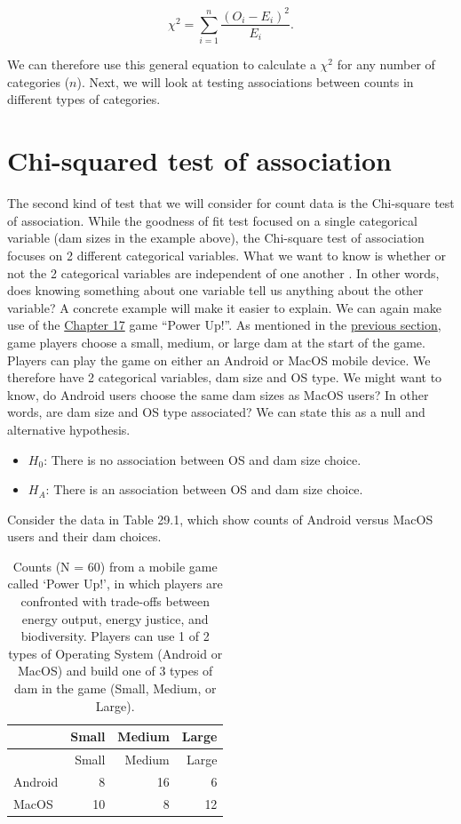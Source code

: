 \documentclass[
]{scrbook}
\providecommand{\tightlist}{%
  \setlength{\itemsep}{0pt}\setlength{\parskip}{0pt}}
\begin{document}
\[\chi^{2} = \sum_{i = 1}^{n} \frac{\left(O_{i} - E_{i}\right)^{2}}{E_{i}}.\]

We can therefore use this general equation to calculate a \(\chi^{2}\) for any number of categories (\(n\)).
Next, we will look at testing associations between counts in different types of categories.

\hypertarget{chi-squared-test-of-association}{%
\section{Chi-squared test of association}\label{chi-squared-test-of-association}}

The second kind of test that we will consider for count data is the Chi-square test of association.
While the goodness of fit test focused on a single categorical variable (dam sizes in the example above), the Chi-square test of association focuses on 2 different categorical variables.
What we want to know is whether or not the 2 categorical variables are independent of one another \citep{Box1978}.
In other words, does knowing something about one variable tell us anything about the other variable?
A concrete example will make it easier to explain.
We can again make use of the \protect\hyperlink{Chapter_17}{Chapter 17} game ``Power Up!''.
As mentioned in the \protect\hyperlink{chi-squared-goodness-of-fit}{previous section}, game players choose a small, medium, or large dam at the start of the game.
Players can play the game on either an Android or MacOS mobile device.
We therefore have 2 categorical variables, dam size and OS type.
We might want to know, do Android users choose the same dam sizes as MacOS users?
In other words, are dam size and OS type associated?
We can state this as a null and alternative hypothesis.

\begin{itemize}
\tightlist
\item
  \(H_{0}\): There is no association between OS and dam size choice.
\item
  \(H_{A}\): There is an association between OS and dam size choice.
\end{itemize}

Consider the data in Table 29.1, which show counts of Android versus MacOS users and their dam choices.

\begin{longtable}[]{@{}lrrr@{}}
\caption{\label{tab:unnamed-chunk-139}Counts (N = 60) from a mobile game called `Power Up!', in which players are confronted with trade-offs between energy output, energy justice, and biodiversity. Players can use 1 of 2 types of Operating System (Android or MacOS) and build one of 3 types of dam in the game (Small, Medium, or Large).}\tabularnewline
\toprule
& Small & Medium & Large \\
\midrule
\endfirsthead
\toprule
& Small & Medium & Large \\
\midrule
\endhead
Android & 8 & 16 & 6 \\
MacOS & 10 & 8 & 12 \\
\bottomrule
\end{longtable}
\end{document}
